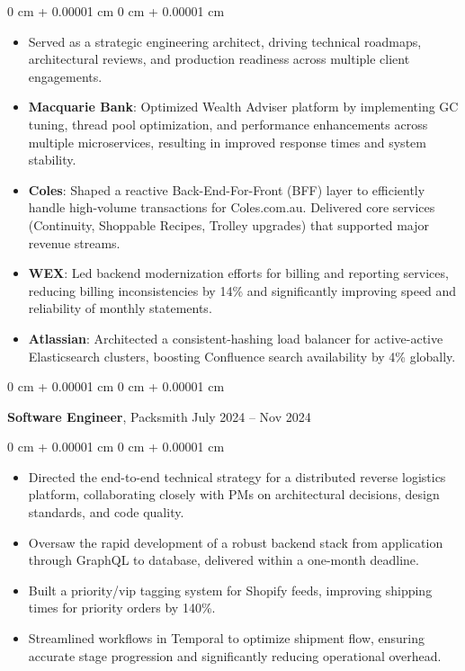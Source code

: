 \documentclass[10pt, letterpaper]{article}
\newenvironment{highlights}{
    \begin{itemize}[
        topsep=0.10 cm,
        parsep=0.10 cm,
        partopsep=0pt,
        itemsep=0pt,
        leftmargin=0 cm + 10pt
    ]
}{
    \end{itemize}
} %
\newenvironment{onecolentry}{
    \begin{adjustwidth}{
        0 cm + 0.00001 cm
    }{
        0 cm + 0.00001 cm
    }
}{
    \end{adjustwidth}
} %
\newenvironment{twocolentry}[2][]{
    \onecolentry
    \def\secondColumn{#2}
    \setcolumnwidth{\fill, 4.5 cm}
    \begin{paracol}{2}
}{
    \switchcolumn \raggedleft \secondColumn
    \end{paracol}
    \endonecolentry
} %
\begin{document}
        \vspace{0.10 cm}
        \begin{onecolentry}
            \begin{highlights}
                \item Served as a strategic engineering architect, driving technical roadmaps, architectural reviews, and production readiness across multiple client engagements.
                \item \textbf{Macquarie Bank}: Optimized Wealth Adviser platform by implementing GC tuning, thread pool optimization, and performance enhancements across multiple microservices, resulting in improved response times and system stability.
                \item \textbf{Coles}: Shaped a reactive Back-End-For-Front (BFF) layer to efficiently handle high-volume transactions for Coles.com.au. Delivered core services (Continuity, Shoppable Recipes, Trolley upgrades) that supported major revenue streams.
                \item \textbf{WEX}: Led backend modernization efforts for billing and reporting services, reducing billing inconsistencies by 14\% and significantly improving speed and reliability of monthly statements.
                \item \textbf{Atlassian}: Architected a consistent-hashing load balancer for active-active Elasticsearch clusters, boosting Confluence search availability by 4\% globally.
            \end{highlights}
        \end{onecolentry}

        \vspace{0.15 cm}
        \begin{twocolentry}{
            July 2024 – Nov 2024
        }
            \textbf{Software Engineer}, Packsmith\end{twocolentry}

        \vspace{0.10 cm}
        \begin{onecolentry}
            \begin{highlights}
                \item Directed the end-to-end technical strategy for a distributed reverse logistics platform, collaborating closely with PMs on architectural decisions, design standards, and code quality.
                \item Oversaw the rapid development of a robust backend stack from application through GraphQL to database, delivered within a one-month deadline.
                \item Built a priority/vip tagging system for Shopify feeds, improving shipping times for priority orders by 140\%.
                \item Streamlined workflows in Temporal to optimize shipment flow, ensuring accurate stage progression and significantly reducing operational overhead.
            \end{highlights}
        \end{onecolentry}
        
\end{document}
